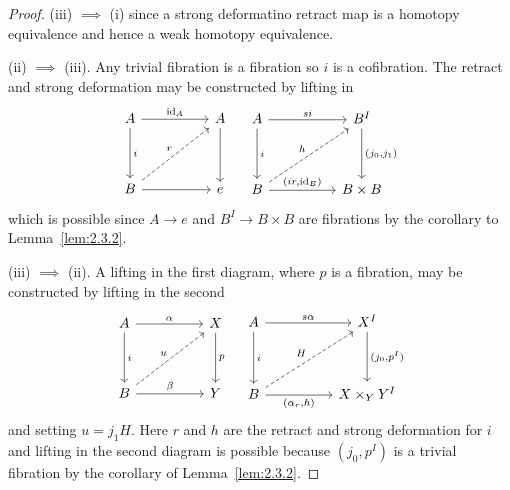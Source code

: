 \documentclass[../main]{subfiles}
\begin{document}
\begin{proof}
(iii) $\implies$ (i) since a strong deformatino retract map is a homotopy equivalence and hence a weak homotopy equivalence. 

(ii) $\implies$ (iii). Any trivial fibration is a fibration so $i$ is a cofibration. The retract and strong deformation may be constructed by lifting in 
\begin{equation*}
\begin{tikzcd}
A \arrow[rr, "\id_A"] \arrow[dd, "i"] & & A \arrow[dd] \\
                                       &  &              \\
B \arrow[rruu, "r", dashed] \arrow[rr] &  & e           
\end{tikzcd}
\quad
\begin{tikzcd}
A \arrow[rr, "si"] \arrow[dd, "i"]                      &  & B^I \arrow[dd, "{(j_0, j_1)}"] \\
                                                        &  &                                \\
B \arrow[rr, "{(ir, \id_B)}"] \arrow[rruu, "h", dashed] &  & B\times B                     
\end{tikzcd}
\end{equation*} 
which is possible since $A \to e$ and $B^I \to B \times B$ are fibrations by the corollary to Lemma~\ref{lem:2.3.2}.

(iii) $\implies$ (ii). A lifting in the first diagram, where $p$ is a fibration, may be constructed by lifting in the second 
\begin{equation*}
\begin{tikzcd}
A \arrow[rr, "\alpha"] \arrow[dd, "i"]          &  & X \arrow[dd, "p"] \\
                                                &  &                   \\
B \arrow[rr, "\beta"] \arrow[rruu, "u", dashed] &  & Y                
\end{tikzcd}
\quad
\begin{tikzcd}
A \arrow[rr, "s\alpha"] \arrow[dd, "i"]                    &  & X^I \arrow[dd, "{(j_0, p^I)}"] \\
                                                           &  &                                \\
B \arrow[rruu, "H", dashed] \arrow[rr, "{(\alpha_r, h)}"'] &  & X \times_Y Y^I                
\end{tikzcd}
\end{equation*} 
and setting $u = j_1 H$. Here $r$ and $h$ are the retract and strong deformation for $i$ and lifting in the second diagram is possible because $(j_0, p^I)$ is a trivial fibration by the corollary of Lemma~\ref{lem:2.3.2}.


\end{proof}
\end{document}
